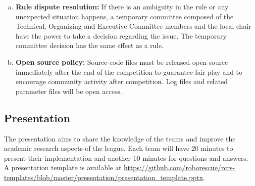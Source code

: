 \documentclass{article}
\begin{document}
\begin{enumerate}[(a)]
\item \textbf{Rule dispute resolution:} If there is an ambiguity in the rule or any unexpected situation happens, a temporary committee composed of the Technical, Organizing and Executive Committee members and the local chair have the power to take a decision regarding the issue. The temporary committee decision has the same effect as a rule.
\item \textbf{Open source policy:} Source-code files must be released open-source immediately after the end of the competition to guarantee fair play and to encourage community activity after competition. Log files and related parameter files will be open access.
\end{enumerate}
\subsection{Presentation}
\label{sec:presentation}
The presentation aims to share the knowledge of the teams and improve the academic research aspects of the league. Each team will have $20$ minutes to present their implementation and another $10$ minutes for questions and answers. A presentation template is available at \url{https://github.com/roborescue/rcrs-templates/blob/master/presentation/presentation_template.pptx}.
\end{document}
